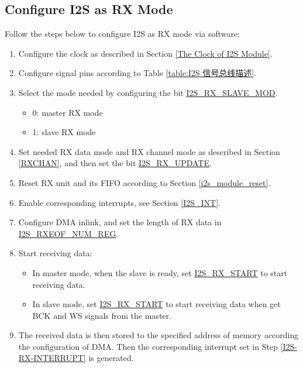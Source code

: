 \documentclass[main\_\_CN.tex]{subfiles}
\begin{document}
\subsection{ Configure I2S as RX Mode}\label{sec:configure-i2s-as-rx-mode}
Follow the steps below to configure I2S as RX mode via software:

\begin{enumerate}
    \item Configure the clock as described in Section  \ref{The Clock of I2S Module}.

    \item Configure signal pins according to Table  \ref{table:I2S 信号总线描述}.

    \item Select the mode needed by configuring the bit \hyperref[fielddesc:I2SRXSLAVEMOD]{ I2S\_RX\_SLAVE\_MOD}.
    \begin{itemize}
        \item 0: master RX mode
        \item 1: slave RX mode
    \end{itemize}

    \item Set needed RX data mode and RX channel mode as described in Section  \ref{RXCHAN}, and then set the bit  \hyperref[fielddesc:I2SRXUPDATE]{I2S\_RX\_UPDATE}.

    \item Reset RX unit and its FIFO according to Section  \ref{i2s_module_reset}.
    \item Enable corresponding interrupts, see Section  \ref{I2S_INT}.\label{I2S-RX-INTERRUPT}

    \item Configure DMA inlink, and set the length of RX data in  \hyperref[regdesc:I2SRXEOFNUMREG]{I2S\_RXEOF\_NUM\_REG}.

    \item Start receiving data:
    \begin{itemize}
        \item In master mode, when the slave is ready, set  \hyperref[fielddesc:I2SRXSTART]{I2S\_RX\_START} to start receiving data.
        \item In slave mode, set  \hyperref[fielddesc:I2SRXSTART]{I2S\_RX\_START} to start receiving data when get BCK and WS signals from the master.
    \end{itemize}
    \item The received data is then stored to the specified address of  \chipname{} memory according the configuration of DMA. Then the corresponding interrupt set in Step  \ref{I2S-RX-INTERRUPT} is generated.
\end{enumerate}
\end{document}
